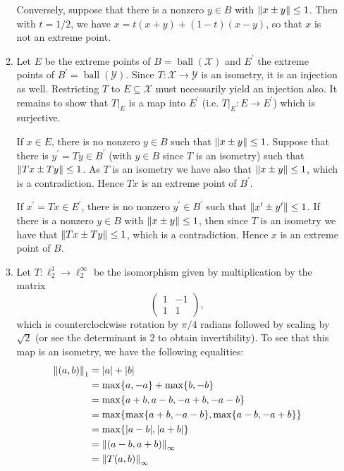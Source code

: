 \documentclass[11pt]{article}
\DeclareMathOperator{\ball}{ball}
\begin{document}
\begin{enumerate}
\begin{enumerate}
      Conversely, suppose that there is a nonzero $y\in B$ with $\norm{x\pm y}\leq 1$. Then with $t = 1/2$, we have $x = t(x+y)+(1-t)(x-y)$, so that $x$ is not an extreme point.

      \item Let $E$ be the extreme points of $B = \ball(\mathcal{X})$ and $E^\prime$ the extreme points of $B^\prime = \ball(\mathcal{Y})$. Since $T\colon \mathcal{X}\to\mathcal{Y}$ is an isometry, it is an injection as well. Restricting $T$ to $E\subseteq \mathcal{X}$ must necessarily yield an injection also. It remains to show that $T|_{E}$ is a map into $E^\prime$ (i.e. $T|_{E}\colon E\to E^\prime$) which is surjective.
      
      If $x\in E$, there is no nonzero $y\in B$ such that $\norm{x\pm y}\leq 1$. Suppose that there is $y^\prime = Ty\in B^\prime$ (with $y\in B$ since $T$ is an isometry) such that $\norm{Tx\pm Ty}\leq 1$. As $T$ is an isometry we have also that $\norm{x\pm y}\leq 1$, which is a contradiction. Hence $Tx$ is an extreme point of $B^\prime$.

      If $x^\prime = Tx \in E^\prime$, there is no nonzero $y^\prime\in B^\prime$ such that $\norm{x^\prime\pm y^\prime}\leq 1$. If there is a nonzero $y\in B$ with $\norm{x\pm y}\leq 1$, then since $T$ is an isometry we have that $\norm{Tx\pm Ty}\leq 1$, which is a contradiction. Hence $x$ is an extreme point of $B$. 
      
      \item Let $T\colon \ell_2^1\to \ell_2^\infty$ be the isomorphism given by multiplication by the matrix \[\begin{pmatrix}
        1 & -1 \\ 1 & 1
      \end{pmatrix},\] which is counterclockwise rotation by $\pi/4$ radians followed by scaling by $\sqrt{2}$ (or see the determinant is $2$ to obtain invertibility). To see that this map is an isometry, we have the following equalities: \begin{align*}
        \norm{(a,b)}_1 &= \abs{a}+\abs{b} \\
        &= \max\{a,-a\} + \max\{b,-b\}\\
        &= \max\{a+b,a-b,-a+b,-a-b\}\\
        &= \max\{\max\{a+b,-a-b\},\max\{a-b,-a+b\}\}\\
        &= \max\{\abs{a-b},\abs{a+b}\}\\
        &= \norm{(a-b,a+b)}_\infty\\ 
        &=\norm{T(a,b)}_\infty
      \end{align*}


\end{enumerate}
\end{enumerate}
\end{document}
